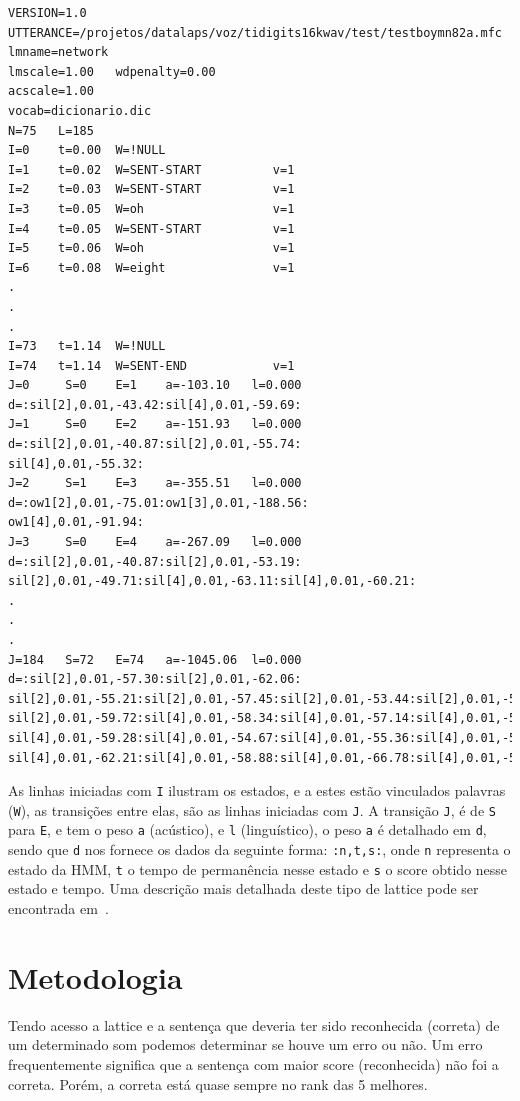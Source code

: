 \documentclass[a4paper]{article}
\begin{document}
\begin{verbatim}
VERSION=1.0
UTTERANCE=/projetos/datalaps/voz/tidigits16kwav/test/testboymn82a.mfc
lmname=network
lmscale=1.00   wdpenalty=0.00  
acscale=1.00  
vocab=dicionario.dic
N=75   L=185  
I=0    t=0.00  W=!NULL               
I=1    t=0.02  W=SENT-START          v=1  
I=2    t=0.03  W=SENT-START          v=1  
I=3    t=0.05  W=oh                  v=1  
I=4    t=0.05  W=SENT-START          v=1  
I=5    t=0.06  W=oh                  v=1  
I=6    t=0.08  W=eight               v=1  
.
.
.
I=73   t=1.14  W=!NULL               
I=74   t=1.14  W=SENT-END            v=1  
J=0     S=0    E=1    a=-103.10   l=0.000   d=:sil[2],0.01,-43.42:sil[4],0.01,-59.69:
J=1     S=0    E=2    a=-151.93   l=0.000   d=:sil[2],0.01,-40.87:sil[2],0.01,-55.74:
sil[4],0.01,-55.32:
J=2     S=1    E=3    a=-355.51   l=0.000   d=:ow1[2],0.01,-75.01:ow1[3],0.01,-188.56:
ow1[4],0.01,-91.94:
J=3     S=0    E=4    a=-267.09   l=0.000   d=:sil[2],0.01,-40.87:sil[2],0.01,-53.19:
sil[2],0.01,-49.71:sil[4],0.01,-63.11:sil[4],0.01,-60.21:
.
.
.
J=184   S=72   E=74   a=-1045.06  l=0.000   d=:sil[2],0.01,-57.30:sil[2],0.01,-62.06:
sil[2],0.01,-55.21:sil[2],0.01,-57.45:sil[2],0.01,-53.44:sil[2],0.01,-56.24:
sil[2],0.01,-59.72:sil[4],0.01,-58.34:sil[4],0.01,-57.14:sil[4],0.01,-59.52:
sil[4],0.01,-59.28:sil[4],0.01,-54.67:sil[4],0.01,-55.36:sil[4],0.01,-53.63:
sil[4],0.01,-62.21:sil[4],0.01,-58.88:sil[4],0.01,-66.78:sil[4],0.01,-57.83:
\end{verbatim}

As linhas iniciadas com \texttt{I} ilustram os estados, e a estes estão vinculados
palavras (\texttt{W}), as transições entre elas, são as linhas iniciadas com \texttt{J}. A
transição \texttt{J}, é de \texttt{S} para \texttt{E}, e tem o peso \texttt{a} (acústico),
e \texttt{l} (linguístico), o peso \texttt{a} é detalhado em \texttt{d}, sendo que \texttt{d}
nos fornece os dados da seguinte forma: \texttt{:n,t,s:}, onde \texttt{n} representa
o estado da HMM, \texttt{t} o tempo de permanência nesse estado e \texttt{s} o score
obtido nesse estado e tempo. Uma descrição mais detalhada deste tipo de lattice pode 
ser encontrada em~\cite{htkbook}.

\section{Metodologia}

Tendo acesso a lattice e a sentença que deveria ter sido reconhecida (correta) de um
determinado som podemos determinar se houve um erro ou não. Um erro
frequentemente significa que a sentença com maior score (reconhecida) não foi a correta.
Porém, a correta está quase sempre no rank das 5 melhores.
\end{document}
